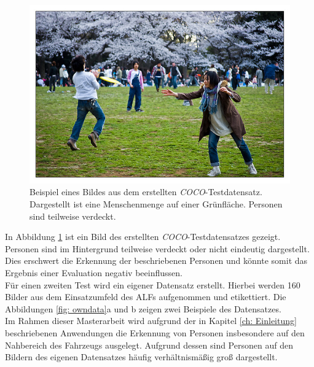 		\begin{figure}[H]
			\centering
			\includegraphics[width=1\textwidth]{Bilder/coco1.jpg}
			\caption{Beispiel eines Bildes aus dem erstellten \textit{COCO}-Testdatensatz. Dargestellt ist eine Menschenmenge auf einer Grünfläche. Personen sind teilweise verdeckt.}
			\label{fig: cocotest}
		\end{figure}
	
		In Abbildung \ref{fig: cocotest} ist ein Bild des erstellten \textit{COCO}-Testdatensatzes gezeigt. Personen sind im Hintergrund teilweise verdeckt oder nicht eindeutig dargestellt. Dies erschwert die Erkennung der beschriebenen Personen und könnte somit das Ergebnis einer Evaluation negativ beeinflussen. \\ 
		
		Für einen zweiten Test wird ein eigener Datensatz erstellt. Hierbei werden 160 Bilder aus dem Einsatzumfeld des ALFs aufgenommen und etikettiert. Die Abbildungen \ref{fig: owndata}a und b zeigen zwei Beispiele des Datensatzes. \\
		
		Im Rahmen dieser Masterarbeit wird aufgrund der in Kapitel \ref{ch: Einleitung} beschriebenen Anwendungen die Erkennung von Personen insbesondere auf den Nahbereich des Fahrzeugs ausgelegt. Aufgrund dessen sind Personen auf den Bildern des eigenen Datensatzes häufig verhältnismäßig groß dargestellt.\\
		

